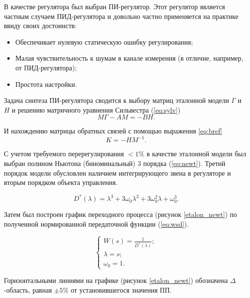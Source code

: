 В качестве регулятора был выбран ПИ-регулятор. Этот регулятор является частным случаем ПИД-регулятора
и довольно частно применяется на практике ввиду своих достоинств:

\begin{itemize}
  \item Обеспечивает нулевую статическую ошибку регулирования;
  \item Малая чувствительность к шумам в канале измерения (в отличие, например, от ПИД-регулятора);
  \item Простота настройки.
\end{itemize}

Задача синтеза ПИ-регулятора сводится к выбору матриц эталонной модели $\Gamma$ и $H$ и 
решению матричного уравнения Сильвестра (\ref{eq:sylv}) \cite{МодальноеУправление}
\begin{equation}
  M\Gamma-AM=-BH.
  \label{eq:sylv}
\end{equation}

И нахождению матрицы обратных связей с помощью выражения \ref{eq:bref}
\begin{equation}
  K = -HM^{-1}.
  \label{eq:bref}
\end{equation}

С учетом требуемого перерегулирования $<1\%$ в качестве эталонной модели был выбран 
полином Ньютона (биноминальный) 3 порядка (\ref{eq:newt}). Третий порядок
модели обусловлен наличием интегрирующего звена в регуляторе и вторым порядком
объекта управления.

\begin{equation}
  D^{\text{*}}(\lambda)=\lambda^3+3\omega_0\lambda^2+3\omega_0^2\lambda+\omega_0^3.
  \label{eq:newt}
\end{equation}

Затем был построен график переходного процесса (рисунок \ref{etalon_newt}) по полученной нормированной 
передаточной функции (\ref{eq:wsd}).

\begin{equation}
  \begin{cases}
    W(s)=\frac{1}{D^{\text{*}}(\lambda)};
    \\
    \lambda=s;
    \\
    \omega_0=1.
  \end{cases}
  \label{eq:wsd}
\end{equation}

Горизонтальными линиями на графике (рисунок \ref{etalon_newt}) обозначена $\Delta$-область, равная
$\pm5\%$ от установившегося значения ПП.

